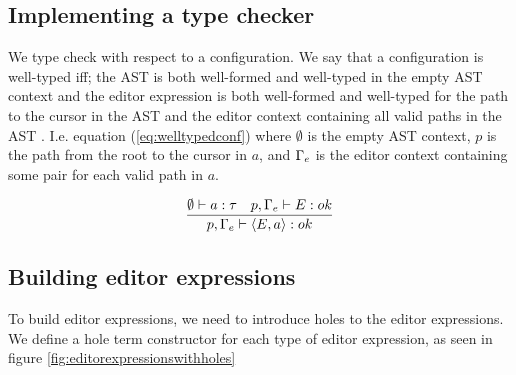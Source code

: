 \subsection{Implementing a type checker}

We type check with respect to a
configuration. We say that a configuration is well-typed iff; the AST is both
well-formed and well-typed in the empty AST context and the editor expression
is both well-formed and well-typed for the path to the cursor in the AST and
the editor context containing all valid paths in the AST \pepm. I.e. equation
(\ref{eq:welltypedconf}) where $\emptyset$ is the empty AST context, $p$ is the
path from the root to the cursor in $a$, and $\Gamma_{e}$ is the editor context
containing some pair for each valid path in $a$.

\begin{equation}\label{eq:welltypedconf}
  \frac{\emptyset \vdash a : \tau \quad p,\Gamma_{e} \vdash E : ok} {p,\Gamma_{e} \vdash \langle E,a \rangle : ok}\\ 
\end{equation}

\subsection{Building editor expressions}

To build editor expressions, we need to introduce holes to the editor
expressions. We define a hole term constructor for each type of editor
expression, as seen in figure \ref{fig:editorexpressionswithholes}

